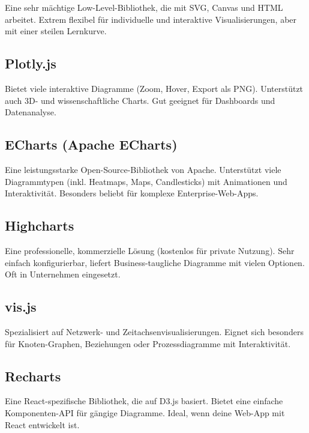 Eine sehr mächtige Low-Level-Bibliothek, die mit SVG, Canvas und HTML arbeitet. Extrem flexibel für individuelle und interaktive Visualisierungen, aber mit einer steilen Lernkurve.



\subsection*{Plotly.js}

Bietet viele interaktive Diagramme (Zoom, Hover, Export als PNG). Unterstützt auch 3D- und wissenschaftliche Charts. Gut geeignet für Dashboards und Datenanalyse.



\subsection*{ECharts (Apache ECharts)}

Eine leistungsstarke Open-Source-Bibliothek von Apache. Unterstützt viele Diagrammtypen (inkl. Heatmaps, Maps, Candlesticks) mit Animationen und Interaktivität. Besonders beliebt für komplexe Enterprise-Web-Apps.



\subsection*{Highcharts}

Eine professionelle, kommerzielle Lösung (kostenlos für private Nutzung). Sehr einfach konfigurierbar, liefert Business-taugliche Diagramme mit vielen Optionen. Oft in Unternehmen eingesetzt.



\subsection*{vis.js}

Spezialisiert auf Netzwerk- und Zeitachsenvisualisierungen. Eignet sich besonders für Knoten-Graphen, Beziehungen oder Prozessdiagramme mit Interaktivität.



\subsection*{Recharts}

Eine React-spezifische Bibliothek, die auf D3.js basiert. Bietet eine einfache Komponenten-API für gängige Diagramme. Ideal, wenn deine Web-App mit React entwickelt ist.



\pagebreak

